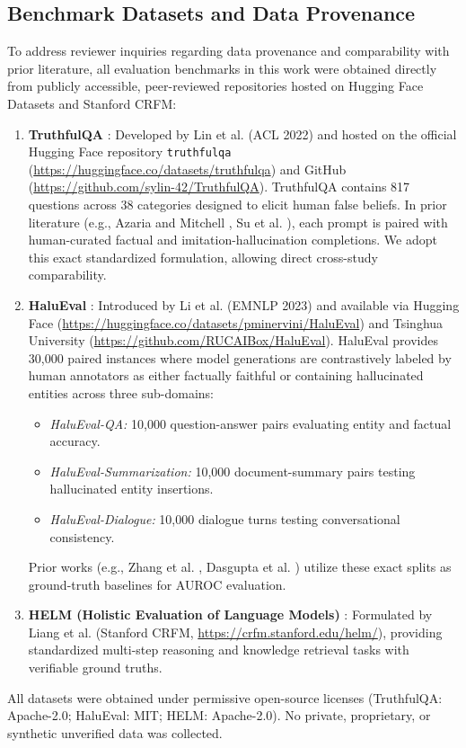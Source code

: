 \documentclass[journal]{IEEEtran}
\begin{document}
\subsection{Benchmark Datasets and Data Provenance}
To address reviewer inquiries regarding data provenance and comparability with prior literature, all evaluation benchmarks in this work were obtained directly from publicly accessible, peer-reviewed repositories hosted on Hugging Face Datasets and Stanford CRFM:
\begin{enumerate}
    \item \textbf{TruthfulQA} \cite{lin2022truthfulqa}: Developed by Lin et al. (ACL 2022) and hosted on the official Hugging Face repository \texttt{truthfulqa} (\url{https://huggingface.co/datasets/truthfulqa}) and GitHub (\url{https://github.com/sylin-42/TruthfulQA}). TruthfulQA contains 817 questions across 38 categories designed to elicit human false beliefs. In prior literature (e.g., Azaria and Mitchell \cite{azaria2023internal}, Su et al. \cite{su2024mind}), each prompt is paired with human-curated factual and imitation-hallucination completions. We adopt this exact standardized formulation, allowing direct cross-study comparability.
    \item \textbf{HaluEval} \cite{li2023halueval}: Introduced by Li et al. (EMNLP 2023) and available via Hugging Face (\url{https://huggingface.co/datasets/pminervini/HaluEval}) and Tsinghua University (\url{https://github.com/RUCAIBox/HaluEval}). HaluEval provides 30,000 paired instances where model generations are contrastively labeled by human annotators as either factually faithful or containing hallucinated entities across three sub-domains:
    \begin{itemize}
        \item \textit{HaluEval-QA:} 10,000 question-answer pairs evaluating entity and factual accuracy.
        \item \textit{HaluEval-Summarization:} 10,000 document-summary pairs testing hallucinated entity insertions.
        \item \textit{HaluEval-Dialogue:} 10,000 dialogue turns testing conversational consistency.
    \end{itemize}
    Prior works (e.g., Zhang et al. \cite{zhang2025mhad}, Dasgupta et al. \cite{dasgupta2025hallushift}) utilize these exact splits as ground-truth baselines for AUROC evaluation.
    \item \textbf{HELM (Holistic Evaluation of Language Models)} \cite{liang2022holistic}: Formulated by Liang et al. (Stanford CRFM, \url{https://crfm.stanford.edu/helm/}), providing standardized multi-step reasoning and knowledge retrieval tasks with verifiable ground truths.
\end{enumerate}
All datasets were obtained under permissive open-source licenses (TruthfulQA: Apache-2.0; HaluEval: MIT; HELM: Apache-2.0). No private, proprietary, or synthetic unverified data was collected.
\end{document}
